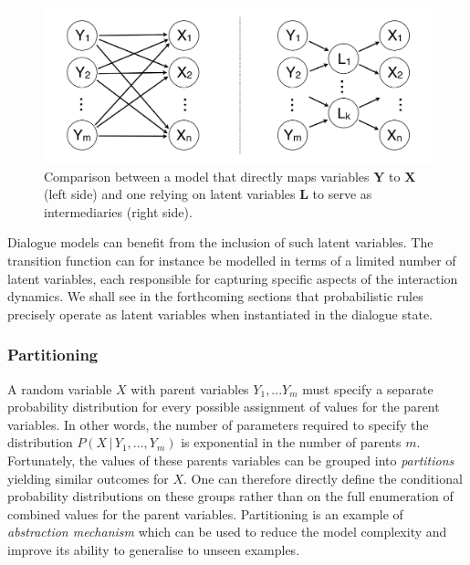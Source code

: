  \begin{figure}[h]
\centering
\includegraphics[scale=0.25]{imgs/latentvariables.pdf}
\caption{Comparison between a model that directly maps variables $\mathbf{Y}$ to $\mathbf{X}$ (left side) and one relying on latent variables $\mathbf{L}$ to serve as intermediaries (right side).}
\label{fig:latentvariables}
\end{figure}

Dialogue models can benefit from the inclusion of such latent variables. The transition function can for instance be modelled in terms of a limited number of latent variables, each responsible for capturing specific aspects of the interaction dynamics.  We shall see in the forthcoming sections that probabilistic rules precisely operate as latent variables when instantiated in the dialogue state. 

\subsubsection*{Partitioning}

A random variable $X$ with parent variables $Y_1,...Y_m$ must specify a separate probability distribution for every possible assignment of values for the parent variables. In other words, the number of parameters required to specify the distribution $P(X \, | \, Y_1,..., Y_m)$ is exponential in the number of parents $m$. Fortunately, the values of these parents variables can be grouped into \textit{partitions} yielding similar outcomes for $X$. One can therefore directly define the conditional probability distributions on these groups rather than on the full enumeration of combined values for the parent variables. Partitioning is an example of \textit{abstraction mechanism} which can be used to reduce the model complexity and improve its ability to generalise to unseen examples. 


